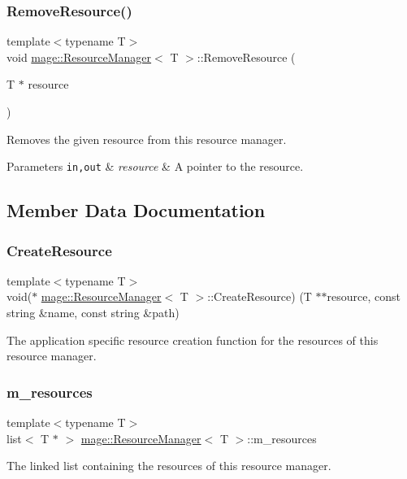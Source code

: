 \subsubsection{\texorpdfstring{Remove\+Resource()}{RemoveResource()}}
{\footnotesize\ttfamily template$<$typename T$>$ \\
void \hyperlink{classmage_1_1_resource_manager}{mage\+::\+Resource\+Manager}$<$ T $>$\+::Remove\+Resource (\begin{DoxyParamCaption}\item[{T $\ast$}]{resource }\end{DoxyParamCaption})}

Removes the given resource from this resource manager.


\begin{DoxyParams}[1]{Parameters}
\mbox{\tt in,out}  & {\em resource} & A pointer to the resource. \\
\hline
\end{DoxyParams}


\subsection{Member Data Documentation}
\hypertarget{classmage_1_1_resource_manager_a1175cdd82a5407dd099b53a432ca9a95}{}\label{classmage_1_1_resource_manager_a1175cdd82a5407dd099b53a432ca9a95} 
\subsubsection{\texorpdfstring{Create\+Resource}{CreateResource}}
{\footnotesize\ttfamily template$<$typename T$>$ \\
void($\ast$ \hyperlink{classmage_1_1_resource_manager}{mage\+::\+Resource\+Manager}$<$ T $>$\+::Create\+Resource) (T $\ast$$\ast$resource, const string \&name, const string \&path)\hspace{0.3cm}{\ttfamily [protected]}}

The application specific resource creation function for the resources of this resource manager. \hypertarget{classmage_1_1_resource_manager_ab058f7127d317bfe78b9f391a4351315}{}\label{classmage_1_1_resource_manager_ab058f7127d317bfe78b9f391a4351315} 
\subsubsection{\texorpdfstring{m\+\_\+resources}{m\_resources}}
{\footnotesize\ttfamily template$<$typename T$>$ \\
list$<$ T $\ast$ $>$ \hyperlink{classmage_1_1_resource_manager}{mage\+::\+Resource\+Manager}$<$ T $>$\+::m\+\_\+resources\hspace{0.3cm}{\ttfamily [protected]}}

The linked list containing the resources of this resource manager. 